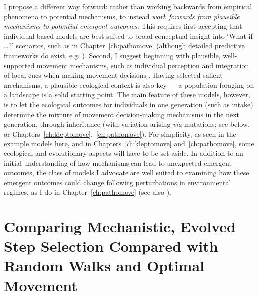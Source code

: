 I propose a different way forward: rather than working backwards from empirical phenomena to potential mechanisms, to instead \textit{work forwards from plausible mechanisms to potential emergent outcomes}.
This requires first accepting that individual-based models are best suited to broad conceptual insight into `What if \ldots?' scenarios, such as in Chapter~\ref{ch:pathomove} (although detailed predictive frameworks do exist, e.g. \cite{bocedi2014}).
Second, I suggest beginning with plausible, well-supported movement mechanisms, such as individual perception and integration of local cues when making movement decisions \parencite{nathan2008a}.
Having selected salient mechanisms, a plausible ecological context is also key --- a population foraging on a landscape is a solid starting point.
The main feature of these models, however, is to let the ecological outcomes for individuals in one generation (such as intake) determine the mixture of movement decision-making mechanisms in the next generation, through inheritance (with variation arising \textit{via} mutations; see below, or Chapters~\ref{ch:kleptomove},~\ref{ch:pathomove}).
For simplicity, as seen in the example models here, and in Chapters~\ref{ch:kleptomove} and~\ref{ch:pathomove}, some ecological and evolutionary aspects will have to be set aside.
In addition to an initial understanding of how mechanisms can lead to unexpected emergent outcomes, the class of models I advocate are well suited to examining how these emergent outcomes could change following perturbations in environmental regimes, as I do in Chapter~\ref{ch:pathomove} (see also \cite{botero2015}).

{ \begin{center}  \end{center} }


\begingroup

\let\clearpage\relax
\let\cleardoublepage\relax
\let\cleardoublepage\relax

{\chapter*{Comparing Mechanistic, Evolved Step Selection Compared with Random Walks and Optimal Movement}}

